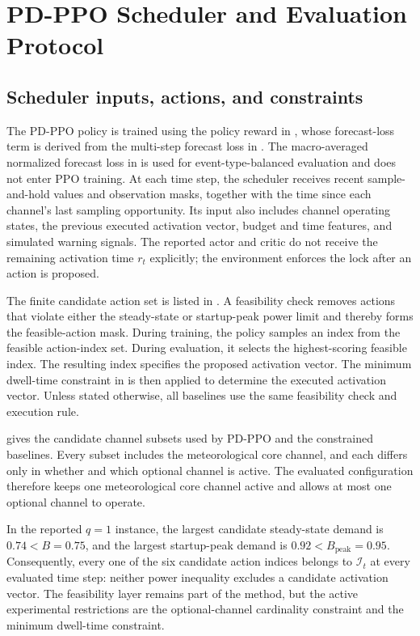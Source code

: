 \section{PD-PPO Scheduler and Evaluation Protocol}
\label{sec:framework_protocol}

\subsection{Scheduler inputs, actions, and constraints}

The PD-PPO policy is trained using the policy reward in
, whose forecast-loss term is derived from the
multi-step forecast loss in . The macro-averaged
normalized forecast loss in  is used for
event-type-balanced evaluation and does not enter PPO training. At each time step,
the scheduler receives recent sample-and-hold values and observation masks,
together with the time since each channel's last sampling opportunity. Its input
also includes channel operating states, the previous executed activation vector,
budget and time features, and simulated warning signals.
The reported actor and critic do not receive the remaining activation time
$r_t$ explicitly; the environment enforces the lock after an action is proposed.

The finite candidate action set is listed in
. A feasibility check removes actions that
violate either the steady-state or startup-peak power limit and thereby forms the
feasible-action mask. During training, the policy samples an index from the
feasible action-index set. During evaluation, it selects the highest-scoring
feasible index. The resulting index specifies the proposed activation vector.
The minimum dwell-time constraint in  is then
applied to determine the executed activation vector. Unless stated otherwise,
all baselines use the same feasibility check and execution rule.

 gives the candidate channel subsets used
by PD-PPO and the constrained baselines. Every subset includes the meteorological core
channel, and each differs only in whether and which optional channel is active. The evaluated
configuration therefore keeps one meteorological core channel active and allows at
most one optional channel to operate.



In the reported $q=1$ instance, the largest candidate steady-state demand is
$0.74<B=0.75$, and the largest startup-peak demand is $0.92<B_{\mathrm{peak}}=0.95$.
Consequently, every one of the six candidate action indices belongs to
$\mathcal{I}_t$ at every evaluated time step: neither power inequality excludes
a candidate activation vector. The feasibility layer remains part of the method,
but the active experimental restrictions are the optional-channel cardinality
constraint and the minimum dwell-time constraint.

